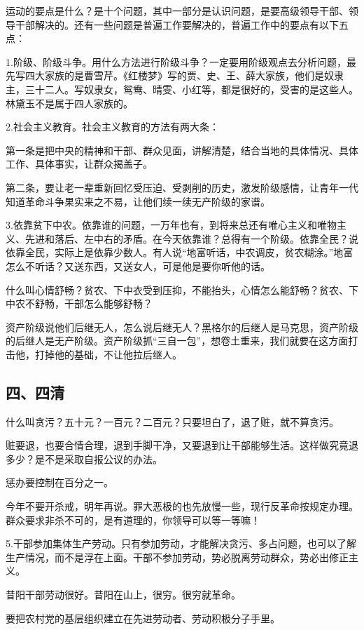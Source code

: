 运动的要点是什么？是十个问题，其中一部分是认识问题，是要高级领导干部、领导干部解决的。还有一些问题是普遍工作要解决的，普遍工作中的要点有以下五点：

1.阶级、阶级斗争。用什么方法进行阶级斗争？一定要用阶级观点去分析问题，最先写四大家族的是曹雪芹。《红楼梦》写的贾、史、王、薛大家族，他们是奴隶主，三十二人。写奴隶女，鸳鸯、晴雯、小红等，都是很好的，受害的是这些人。林黛玉不是属于四人家族的。

2.社会主义教育。社会主义教育的方法有两大条：

第一条是把中央的精神和干部、群众见面，讲解清楚，结合当地的具体情况、具体工作、具体事实，让群众揭盖子。

第二条，要让老一辈重新回忆受压迫、受剥削的历史，激发阶级感情，让青年一代知道革命斗争果实来之不易，让他们续一续无产阶级的家谱。

3.依靠贫下中农。依靠谁的问题，一万年也有，到将来总还有唯心主义和唯物主义、先进和落后、左中右的矛盾。在今天依靠谁？总得有一个阶级。依靠全民？说依靠全民，实际上是依靠少数人。有人说“地富听话，中农调皮，贫农糊涂。”地富怎么不听话？又送东西，又送女人，可是他是要你听他的话。

什么叫心情舒畅？贫农、下中衣受到压抑，不能抬头，心情怎么能舒畅？贫农、下中农不舒畅，干部怎么能够舒畅？

资产阶级说他们后继无人，怎么说后继无人？黑格尔的后继人是马克思，资产阶级的后继人是无产阶级。资产阶级抓“三自一包”，想卷土重来，我们就要在这方面打击他，打掉他的基础，不让他拉后继人。

\subsection{四、四清}

什么叫贪污？五十元？一百元？二百元？只要坦白了，退了赃，就不算贪污。

赃要退，也要合情合理，退到手脚干净，又要退到让干部能够生活。这样做究竟退多少？是不是采取自报公议的办法。

惩办要控制在百分之一。

今年不要开杀戒，明年再说。罪大恶极的也先放慢一些，现行反革命按规定办理。群众要求非杀不可的，是有道理的，你领导可以等一等嘛！

5.干部参加集体生产劳动。只有参加劳动，才能解决贪污、多占问题，也可以了解生产情况，而不是浮在上面。干部不参加劳动，势必脱离劳动群众，势必出修正主义。

昔阳干部劳动很好。昔阳在山上，很穷。很穷就革命。

要把农村党的基层组织建立在先进劳动者、劳动积极分子手里。

